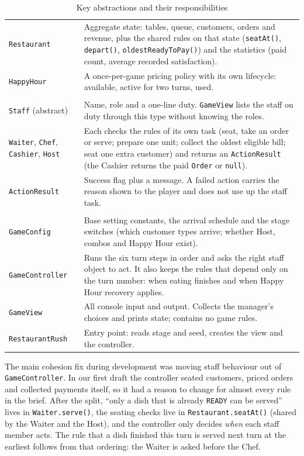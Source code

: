 \begin{table}[H]
\begin{tabularx}{\textwidth}{>{\raggedright\arraybackslash}p{3.6cm}X}
\texttt{Restaurant} & Aggregate state: tables, queue, customers, orders and revenue, plus the shared rules on that state (\texttt{seatAt()}, \texttt{depart()}, \texttt{oldestReadyToPay()}) and the statistics (paid count, average recorded satisfaction). \\
\texttt{HappyHour} & A once-per-game pricing policy with its own lifecycle: available, active for two turns, used. \\
\midrule
\multicolumn{2}{l}{\textit{Staff}} \\
\texttt{Staff} (abstract) & Name, role and a one-line duty. \texttt{GameView} lists the staff on duty through this type without knowing the roles. \\
\texttt{Waiter}, \texttt{Chef}, \texttt{Cashier}, \texttt{Host} & Each checks the rules of its own task (seat, take an order or serve; prepare one unit; collect the oldest eligible bill; seat one extra customer) and returns an \texttt{ActionResult} (the Cashier returns the paid \texttt{Order} or \texttt{null}). \\
\texttt{ActionResult} & Success flag plus a message. A failed action carries the reason shown to the player and does not use up the staff task. \\
\midrule
\multicolumn{2}{l}{\textit{Control and boundary}} \\
\texttt{GameConfig} & Base setting constants, the arrival schedule and the stage switches (which customer types arrive; whether Host, combos and Happy Hour exist). \\
\texttt{GameController} & Runs the six turn steps in order and asks the right staff object to act. It also keeps the rules that depend only on the turn number: when eating finishes and when Happy Hour recovery applies. \\
\texttt{GameView} & All console input and output. Collects the manager's choices and prints state; contains no game rules. \\
\texttt{RestaurantRush} & Entry point: reads stage and seed, creates the view and the controller. \\
\bottomrule
\end{tabularx}
\caption{Key abstractions and their responsibilities}
\end{table}

The main cohesion fix during development was moving staff behaviour out of \texttt{GameController}. In our first draft the controller seated customers, priced orders and collected payments itself, so it had a reason to change for almost every rule in the brief. After the split, ``only a dish that is already \texttt{READY} can be served'' lives in \texttt{Waiter.serve()}, the seating checks live in \texttt{Restaurant.seatAt()} (shared by the Waiter and the Host), and the controller only decides \emph{when} each staff member acts. The rule that a dish finished this turn is served next turn at the earliest follows from that ordering: the Waiter is asked before the Chef.

